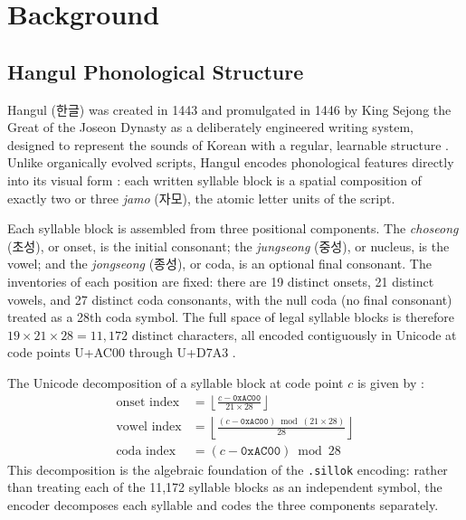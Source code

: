 \documentclass[conference]{IEEEtran}
\begin{document}
\section{Background}
\label{sec:background}

\subsection{Hangul Phonological Structure}

Hangul (한글) was created in 1443 and promulgated in 1446 by King Sejong the
Great of the Joseon Dynasty as a deliberately engineered writing system,
designed to represent the sounds of Korean with a regular, learnable
structure \cite{hunminjeongeum}. Unlike organically
evolved scripts, Hangul encodes phonological features directly into its
visual form \cite{sampson}: each written syllable block is a spatial composition
of exactly two or three \emph{jamo} (자모), the atomic letter units of the script.

Each syllable block is assembled from three positional components. The
\emph{choseong} (초성), or onset, is the initial consonant; the
\emph{jungseong} (중성), or nucleus, is the vowel; and the \emph{jongseong}
(종성), or coda, is an optional final consonant. The inventories of each
position are fixed: there are 19 distinct onsets, 21 distinct vowels, and 27
distinct coda consonants, with the null coda (no final consonant) treated as
a 28th coda symbol. The full space of legal syllable blocks is therefore
$19 \times 21 \times 28 = 11{,}172$ distinct characters, all encoded
contiguously in Unicode at code points U+AC00 through U+D7A3 \cite{nikl, unicodestd}.

The Unicode decomposition of a syllable block at code point $c$ is given by \cite{unicodestd}:
\begin{align}
    \text{onset index}  &= \left\lfloor \frac{c - \texttt{0xAC00}}{21 \times 28} \right\rfloor \\
    \text{vowel index}  &= \left\lfloor \frac{(c - \texttt{0xAC00}) \bmod (21 \times 28)}{28} \right\rfloor \\
    \text{coda index}   &= (c - \texttt{0xAC00}) \bmod 28
\end{align}
This decomposition is the algebraic foundation of the \texttt{.sillok}
encoding: rather than treating each of the 11,172 syllable blocks as an
independent symbol, the encoder decomposes each syllable and codes the three
components separately.
\end{document}
